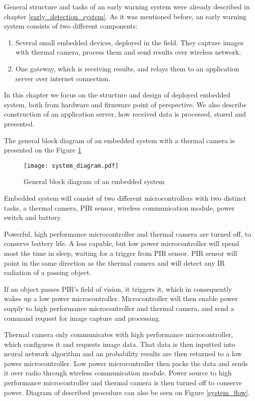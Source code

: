 General structure and tasks of an early warning system were already described in chapter \ref{early_detection_system}.
As it was mentioned before, an early warning system consists of two different components:

\begin{enumerate} 
    \item Several small embedded devices, deployed in the field. They capture images with thermal camera, process them and send results over wireless network.
    \item One gateway, which is receiving results, and relays them to an application server over internet connection.
\end{enumerate} 

In this chapter we focus on the structure and design of deployed embedded system, both from hardware and firmware point of perspective.
We also describe construction of an application server, how received data is processed, stored and presented.

The general block diagram of an embedded system with a thermal camera is presented on the Figure \ref{system_diagram} 

\begin{figure}[ht]
        \centering
        \texttt{[image: system\_diagram.pdf]} 
        \caption{ General block diagram of an embedded system}
        \label{system_diagram}
\end{figure}

Embedded system will consist of two different microcontrollers with two distinct tasks, a thermal camera, PIR sensor, wireless communication module, power switch and battery.

Powerful, high performance microcontroller and thermal camera are turned off, to conserve battery life.
A less capable, but low power microcontroller will spend most the time in sleep, waiting for a trigger from PIR sensor.
PIR sensor will point in the same direction as the thermal camera and will detect any IR radiation of a passing object.

If an object passes PIR's field of vision, it triggers it, which in consequently wakes up a low power microcontroller.
Microcontroller will then enable power supply to high performance microcontroller and thermal camera, and send a command request for image capture and processing.

Thermal camera only communicates with high performance microcontroller, which configures it and requests image data.
That data is then inputted into neural network algorithm and an probability results are then returned to a low power microcontroller.
Low power microcontroller then packs the data and sends it over radio through wireless communication module.
Power source to high performance microcontroller and thermal camera is then turned off to conserve power.
Diagram of described procedure can also be seen on Figure \ref{system_flow}.

